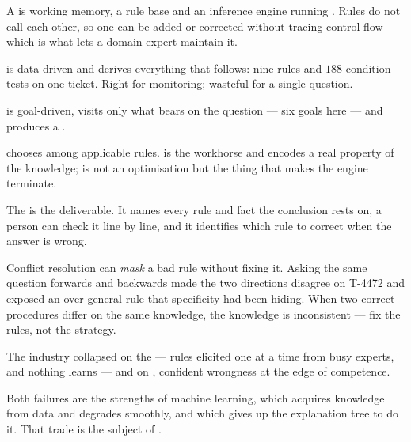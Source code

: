 \begin{chaptersummary}
\begin{tight}
  \item A  is working memory, a rule base and an inference
        engine running . Rules do not call each other, so
        one can be added or corrected without tracing control flow --- which is what
        lets a domain expert maintain it.
  \item {} is data-driven and derives everything that follows:
        nine rules and $188$ condition tests on one ticket. Right for monitoring;
        wasteful for a single question.
  \item {} is goal-driven, visits only what bears on the
        question --- six goals here --- and produces a .
  \item {} chooses among applicable rules.
         is the workhorse and encodes a real property of the
        knowledge;  is not an optimisation but the thing that makes
        the engine terminate.
  \item The  is the deliverable. It names every rule and fact the
        conclusion rests on, a person can check it line by line, and it identifies
        which rule to correct when the answer is wrong.
  \item Conflict resolution can \emph{mask} a bad rule without fixing it. Asking the
        same question forwards and backwards made the two directions disagree on
        T-4472 and exposed an over-general rule that specificity had been hiding.
        When two correct procedures differ on the same knowledge, the knowledge is
        inconsistent --- fix the rules, not the strategy.
  \item The industry collapsed on the  ---
        rules elicited one at a time from busy experts, and nothing learns --- and
        on , confident wrongness at the edge of competence.
  \item Both failures are the strengths of machine learning, which acquires
        knowledge from data and degrades smoothly, and which gives up the
        explanation tree to do it. That trade is the subject of
        .
\end{tight}
\end{chaptersummary}

